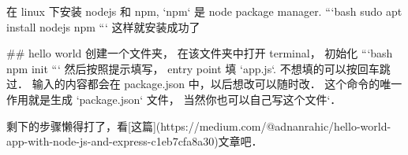 
\begin{issues}
\issueDraft
\end{issues}

在 linux 下安装 nodejs 和 npm, `npm` 是 node package manager.
```bash
sudo apt install nodejs npm
```
这样就安装成功了

## hello world
创建一个文件夹， 在该文件夹中打开 terminal， 初始化
```bash
npm init
```
然后按照提示填写， entry point 填 `app.js`. 不想填的可以按回车跳过． 输入的内容都会在 package.json 中，以后想改可以随时改． 这个命令的唯一作用就是生成 `package.json` 文件， 当然你也可以自己写这个文件`．

剩下的步骤懒得打了，看[这篇](https://medium.com/@adnanrahic/hello-world-app-with-node-js-and-express-c1eb7cfa8a30)文章吧．
